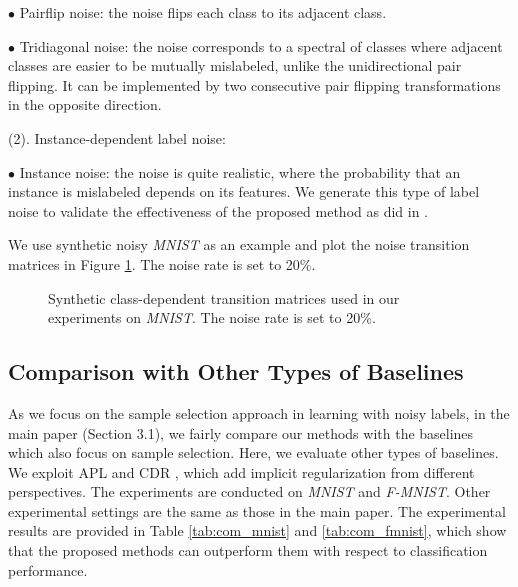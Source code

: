 \documentclass[11pt]{article}
\begin{document}
$\bullet$ Pairflip noise: the noise flips each class to its adjacent class. 

$\bullet$ Tridiagonal noise: the noise corresponds to a spectral of classes where adjacent classes are easier to be mutually mislabeled, unlike the unidirectional pair flipping. It can be implemented by two consecutive pair flipping transformations in the opposite direction.

(2). Instance-dependent label noise: 

$\bullet$ Instance noise: the noise is quite realistic, where the probability that an instance is mislabeled depends on its features. We generate this type of label noise to validate the effectiveness of the proposed method as did in \cite{xia2020part}.

We use synthetic noisy \textit{MNIST} as an example and plot the noise transition matrices in Figure \ref{fig:matrix}. The noise rate is set to 20\%.
\begin{figure}[!t]
\centering
{}\caption{Synthetic class-dependent transition matrices used in our experiments on \textit{MNIST}. The noise rate is set to 20\%.}
\label{fig:matrix}
\end{figure}

\subsection{Comparison with Other Types of Baselines}
As we focus on the sample selection approach in learning with noisy labels, in the main paper (Section 3.1), we fairly compare our methods with the baselines which also focus on sample selection. Here, we evaluate other types of baselines. We exploit APL \cite{ma2020normalized} and CDR \cite{xia2021robust}, which add implicit regularization from different perspectives. The experiments are conducted on \textit{MNIST} and \textit{F-MNIST}. Other experimental settings are the same as those in the main paper. The experimental results are provided in Table \ref{tab:com_mnist} and \ref{tab:com_fmnist}, which show that the proposed methods can outperform them with respect to classification performance. 
\end{document}
